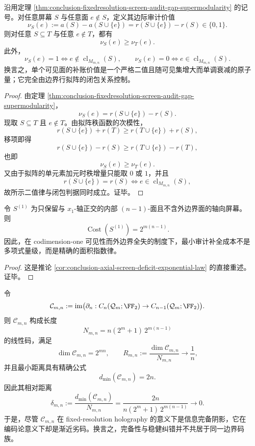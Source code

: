 \begin{corollary}[原子可见面的边际审计价值反单调律]\label{cor:conclusion-fixedresolution-screen-atomic-value-antitone}
沿用定理 \ref{thm:conclusion-fixedresolution-screen-audit-gap-supermodularity} 的记号。对任意屏幕 \(S\) 与任意面 \(e\notin S\)，定义其边际审计价值
\[
\nu_S(e):=a(S)-a(S\cup\{e\})=r(S\cup\{e\})-r(S)\in\{0,1\}.
\]
则对任意 \(S\subseteq T\) 与任意 \(e\notin T\)，都有
\[
\nu_S(e)\ge \nu_T(e).
\]
此外，
\[
\nu_S(e)=1
\iff
e\notin \operatorname{cl}_{M_{m,n}}(S),
\qquad
\nu_S(e)=0
\iff
e\in \operatorname{cl}_{M_{m,n}}(S).
\]
换言之，单个可见面的补账价值是一个严格二值且随可见集增大而单调衰减的原子量；它完全由边界行拟阵的闭包关系控制。
\end{corollary}

\begin{proof}
由定理 \ref{thm:conclusion-fixedresolution-screen-audit-gap-supermodularity}，
\[
\nu_S(e)=r(S\cup\{e\})-r(S).
\]
现取 \(S\subseteq T\) 且 \(e\notin T\)。由拟阵秩函数的次模性，
\[
r(S\cup\{e\})+r(T)\ge r(T\cup\{e\})+r(S),
\]
移项即得
\[
r(S\cup\{e\})-r(S)\ge r(T\cup\{e\})-r(T),
\]
也即
\[
\nu_S(e)\ge \nu_T(e).
\]
又由于拟阵的单元素加元时秩增量只能取 \(0\) 或 \(1\)，并且
\[
r(S\cup\{e\})=r(S)
\iff
e\in \operatorname{cl}_{M_{m,n}}(S),
\]
故所示二值律与闭包判据同时成立。证毕。
\end{proof}

\begin{corollary}\label{cor:conclusion-fixedresolution-axial-screen-corank-area-law}
令 \(S^{(1)}\) 为只保留与 \(x_1\)-轴正交的内部 \((n-1)\)-面且不含外边界面的轴向屏幕。则
\[
\operatorname{Cost}(S^{(1)})=2^{m(n-1)}.
\]
因此，在 codimension-one 可见性而外边界全失的制度下，最小审计补全成本不是多项式量级，而是精确的面积指数律。
\end{corollary}

\begin{proof}
这是推论 \ref{cor:conclusion-axial-screen-deficit-exponential-law} 的直接重述。证毕。
\end{proof}

\begin{theorem}\label{thm:conclusion-fixedresolution-boundary-code-asymptotic-badness}
令
\[
\mathcal C_{m,n}
:=
\operatorname{im}\bigl(
\partial_n:C_n(\mathcal Q_m;\FF_2)\to C_{n-1}(\mathcal Q_m;\FF_2)
\bigr).
\]
则 \(\mathcal C_{m,n}\) 构成长度
\[
N_{m,n}=n(2^m+1)\,2^{m(n-1)}
\]
的线性码，满足
\[
\dim \mathcal C_{m,n}=2^{mn},
\qquad
R_{m,n}:=\frac{\dim \mathcal C_{m,n}}{N_{m,n}}
\longrightarrow
\frac1n,
\]
并且最小距离具有精确公式
\[
d_{\min}(\mathcal C_{m,n})=2n.
\]
因此其相对距离
\[
\delta_{m,n}
:=
\frac{d_{\min}(\mathcal C_{m,n})}{N_{m,n}}
=
\frac{2n}{n(2^m+1)\,2^{m(n-1)}}
\longrightarrow
0.
\]
于是，尽管 \(\mathcal C_{m,n}\) 在 fixed-resolution holography 的意义下是信息完备阴影，它在编码论意义下却是渐近劣码。换言之，完备性与稳健纠错并不共居于同一边界码族。
\end{theorem}

